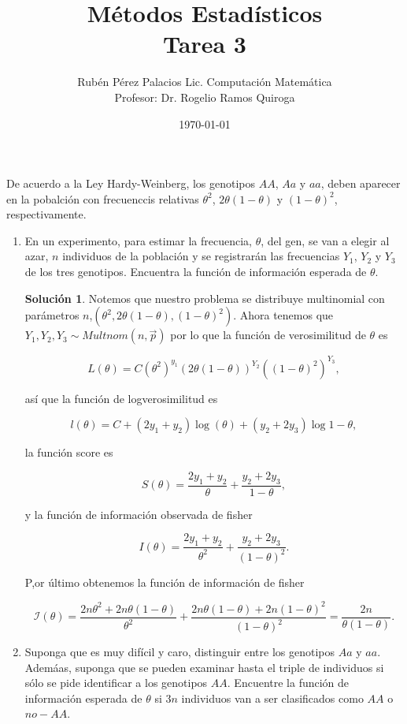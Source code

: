 \documentclass[letterpaper]{article}
\title{Métodos Estadísticos \\ Tarea 3}
\author{Rubén Pérez Palacios Lic. Computación Matemática\\Profesor: Dr. Rogelio Ramos Quiroga}
\date{\today}
\theoremstyle{definition}
\theoremstyle{lemathm}
\theoremstyle{lemathm}
\newtheorem{sol}{Solución}
\theoremstyle{lemathm}
\theoremstyle{lemademthm}
\newcommand{\pars}[1]{\left( #1 \right) }
\newcommand{\1}{\mathbbm{1}}
\begin{document}
	\maketitle
	
	De acuerdo a la Ley Hardy-Weinberg, los genotipos $AA$, $Aa$ y $aa$, deben aparecer en la pobalción con frecuenccis relativas $\theta^2$, $2\theta\pars{1-\theta}$ y $\pars{1-\theta}^2$, respectivamente.
	
	\begin{enumerate}
		\item En un experimento, para estimar la frecuencia, $\theta$, del gen, se van a elegir al azar, $n$ individuos de la población y se registrarán las frecuencias $Y_1$, $Y_2$ y $Y_3$ de los tres genotipos. Encuentra la función de información esperada de $\theta$.
		
		\begin{sol}
			Notemos que nuestro problema se distribuye multinomial con parámetros $n$,\linebreak $\pars{\theta^2,2\theta\pars{1-\theta},\pars{1-\theta}^2}$. Ahora tenemos que $Y_1,Y_2,Y_3\sim Multnom(n,\vec{p})$ por lo que la función de verosimilitud de $\theta$ es

			\[L\pars{\theta} = C\pars{\theta^2}^{y_1}\pars{2\theta\pars{1-\theta}}^{Y_2}\pars{\pars{1-\theta}^2}^{Y_3},\]

			así que la función de logverosimilitud es

			\[l\pars{\theta} = C + \pars{2y_1 + y_2}\log\pars{\theta} + \pars{y_2 + 2y_3}\log{1-\theta},\]

			la función score es

			\[S\pars{\theta} = \frac{2y_1+y_2}{\theta} + \frac{y_2+2y_3}{1-\theta},\]

			y la función de información observada de fisher

			\[I\pars{\theta} = \frac{2y_1+y_2}{\theta^2} + \frac{y_2+2y_3}{\pars{1-\theta}^2}.\]

			P,or último obtenemos la función de información de fisher

			\[\mathcal{I}\pars{\theta} = \frac{2n\theta^2+2n\theta\pars{1-\theta}}{\theta^2} + \frac{2n\theta\pars{1-\theta}+2n\pars{1-\theta}^2}{\pars{1-\theta}^2} = \frac{2n}{\theta\pars{1-\theta}}.\]


		\end{sol}

		\item Suponga que es muy difícil y caro, distinguir entre los genotipos $Aa$ y $aa$. Ademáas, suponga que se pueden examinar hasta el triple de individuos si sólo se pide identificar a los genotipos $AA$. Encuentre la función de información esperada de $\theta$ si $3n$ individuos van a ser clasificados como $AA$ o $no-AA$.
		

\end{enumerate}
\end{document}
